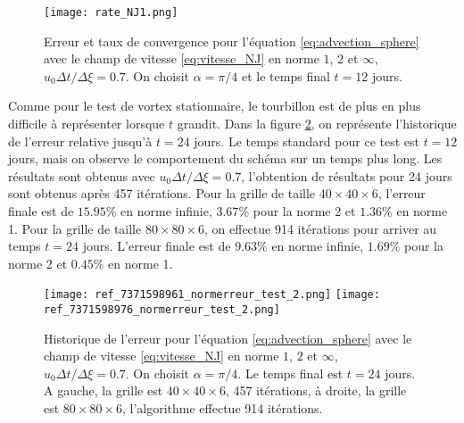 \begin{figure}[htbp]
\begin{center}
\texttt{[image: rate\_NJ1.png]}
\end{center}
\caption{Erreur et taux de convergence pour l'équation \eqref{eq:advection_sphere} avec le champ de vitesse \eqref{eq:vitesse_NJ} en norme $1$, $2$ et $\infty$, $u_0 \Delta t / \Delta \xi = 0.7$. On choisit $\alpha = \pi/4$ et le temps final $t=12$ jours.}
\label{fig:rate1_NJ}
\end{figure} 

Comme pour le test de vortex stationnaire, le tourbillon est de plus en plus difficile à représenter lorsque $t$ grandit. Dans la figure \ref{fig:NJ24jours}, on représente l'historique de l'erreur relative jusqu'à $t=24$ jours. Le temps standard pour ce test est $t=12$ jours, mais on observe le comportement du schéma sur un temps plus long. Les résultats sont obtenus avec $u_0 \Delta t / \Delta \xi = 0.7$, l'obtention de résultats pour 24 jours sont obtenus après 457 itérations. Pour la grille de taille $40 \times 40 \times 6$, l'erreur finale est de $15.95\%$ en norme infinie, $3.67\%$ pour la norme 2 et $1.36\%$ en norme 1. Pour la grille de taille $80 \times 80 \times 6$, on effectue 914 itérations pour arriver au temps $t=24$ jours. L'erreur finale est de $9.63\%$ en norme infinie, $1.69\%$ pour la norme 2 et $0.45\%$ en norme 1.

\begin{figure}[htbp]
\begin{center}
\texttt{[image: ref\_7371598961\_normerreur\_test\_2.png]}
\texttt{[image: ref\_7371598976\_normerreur\_test\_2.png]}
\end{center}
\caption{Historique de l'erreur pour l'équation \eqref{eq:advection_sphere} avec le champ de vitesse \eqref{eq:vitesse_NJ} en norme $1$, $2$ et $\infty$, $u_0 \Delta t / \Delta \xi = 0.7$. On choisit $\alpha = \pi/4$. Le temps final est $t=24$ jours. A gauche, la grille est $40 \times 40  \times 6$, 457 itérations, à droite, la grille est $80 \times 80  \times 6$, l'algorithme effectue 914 itérations.}
\label{fig:NJ24jours}
\end{figure} 

